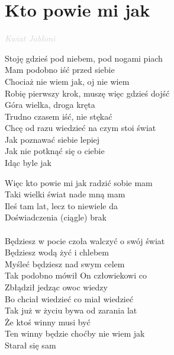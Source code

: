 \documentclass[a5paper, 10pt]{book}
\begin{document}
\section{Kto powie mi jak}\textcolor{lightgray}{\textit{Kwiat Jabłoni}}\vspace*{2mm}\\
\begin{minipage}[t]{0.8\textwidth}
Stoję gdzieś pod niebem, pod nogami piach\\
Mam podobno iść przed siebie\\
Chociaż nie wiem jak, oj nie wiem\\
Robię pierwszy krok, muszę więc gdzieś dojść\\
Góra wielka, droga kręta\\
Trudno czasem iść, nie stękać\\
Chcę od razu wiedzieć na czym stoi świat\\
Jak poznawać siebie lepiej\\
Jak nie potknąć się o ciebie\\
Idąc byle jak\vspace*{1.9mm}

\hspace*{5mm}Więc kto powie mi jak radzić sobie mam \\
\hspace*{5mm}Taki wielki świat nade mną mam \\
\hspace*{5mm}Ileś tam lat, lecz to niewiele da\\
\hspace*{5mm}Doświadczenia (ciągle) brak\\
\\
Będziesz w pocie czoła walczyć o swój świat\\
Będziesz wodą żyć i chlebem\\
Myśleć będziesz nad swym celem\\
Tak podobno mówił On człowiekowi co\\
Zbłądził jedząc owoc wiedzy\\
Bo chciał wiedzieć co miał wiedzieć\\
Tak już w życiu bywa od zarania lat\\
Że ktoś winny musi być\\
Ten winny będzie choćby nie wiem jak\\
Starał się sam\\
\end{minipage}
\end{document}
